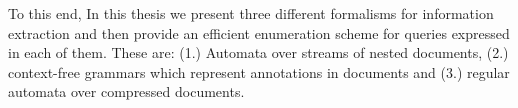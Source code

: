 To this end, In this thesis we present three different formalisms for information extraction and then provide an efficient enumeration scheme for queries expressed in each of them. 
These are: (1.) Automata over streams of nested documents, (2.) context-free grammars which represent annotations in documents and (3.) regular automata over compressed documents. 





